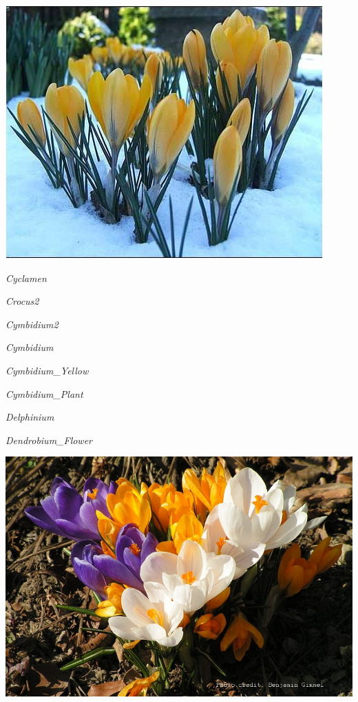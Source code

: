 \documentclass{article}
\begin{document}
\begin{center}
\includegraphics[width=0.9\textheight, angle=90]{../Crocus.jpg}
\end{center}
\newpage

\noindent   
\vfill
\centerline{{\Large\emph{Cyclamen}}}
\vfill
\newpage

\noindent   
\vfill
\centerline{{\Large\emph{Crocus2}}}
\vfill
\newpage

\noindent   
\vfill
\centerline{{\Large\emph{Cymbidium2}}}
\vfill
\newpage

\noindent   
\vfill
\centerline{{\Large\emph{Cymbidium}}}
\vfill
\newpage

\noindent   
\vfill
\centerline{{\Large\emph{Cymbidium_Yellow}}}
\vfill
\newpage

\noindent   
\vfill
\centerline{{\Large\emph{Cymbidium_Plant}}}
\vfill
\newpage

\noindent   
\vfill
\centerline{{\Large\emph{Delphinium}}}
\vfill
\newpage

\noindent   
\vfill
\centerline{{\Large\emph{Dendrobium_Flower}}}
\vfill
\newpage

\begin{center}
\includegraphics[width=0.9\textheight, angle=90]{../Crocus2.jpg}
\end{center}
\newpage
\end{document}
